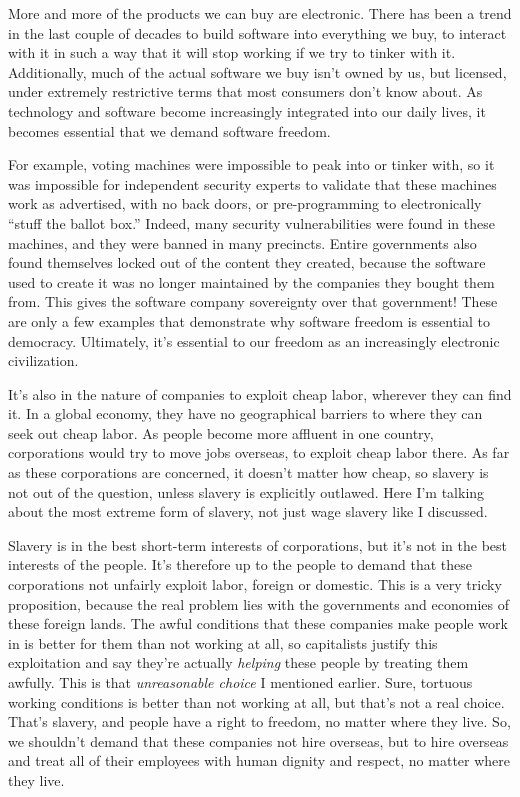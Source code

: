 More and more of the products we can buy are electronic. There has been a trend in the last couple of decades to build software into everything we buy, to interact with it in such a way that it will stop working if we try to tinker with it. Additionally, much of the actual software we buy isn't owned by us, but licensed, under extremely restrictive terms that most consumers don't know about. As technology and software become increasingly integrated into our daily lives, it becomes essential that we demand software freedom.

For example, voting machines were impossible to peak into or tinker with, so it was impossible for independent security experts to validate that these machines work as advertised, with no back doors, or pre-programming to electronically ``stuff the ballot box.'' Indeed, many security vulnerabilities were found in these machines, and they were banned in many precincts. Entire governments also found themselves locked out of the content they created, because the software used to create it was no longer maintained by the companies they bought them from. This gives the software company sovereignty over that government! These are only a few examples that demonstrate why software freedom is essential to democracy. Ultimately, it's essential to our freedom as an increasingly electronic civilization.

It's also in the nature of companies to exploit cheap labor, wherever they can find it. In a global economy, they have no geographical barriers to where they can seek out cheap labor. As people become more affluent in one country, corporations would try to move jobs overseas, to exploit cheap labor there. As far as these corporations are concerned, it doesn't matter how cheap, so slavery is not out of the question, unless slavery is explicitly outlawed. Here I'm talking about the most extreme form of slavery, not just wage slavery like I discussed.

Slavery is in the best short-term interests of corporations, but it's not in the best interests of the people. It's therefore up to the people to demand that these corporations not unfairly exploit labor, foreign or domestic. This is a very tricky proposition, because the real problem lies with the governments and economies of these foreign lands. The awful conditions that these companies make people work in is better for them than not working at all, so capitalists justify this exploitation and say they're actually \emph{helping} these people by treating them awfully. This is that \emph{unreasonable choice} I mentioned earlier. Sure, tortuous working conditions is better than not working at all, but that's not a real choice. That's slavery, and people have a right to freedom, no matter where they live. So, we shouldn't demand that these companies not hire overseas, but to hire overseas and treat all of their employees with human dignity and respect, no matter where they live.

